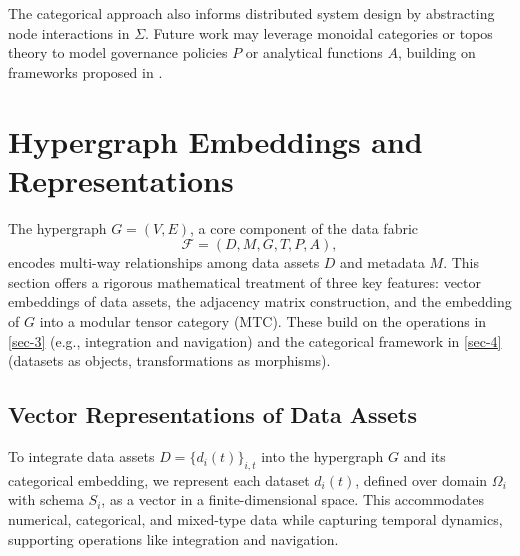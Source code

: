 \documentclass{amsart}
\newcommand\cF{\mathcal{F}}
\begin{document}
The categorical approach also informs distributed system design by abstracting node interactions in \( \Sigma \). Future work may leverage monoidal categories or topos theory to model governance policies \( P \) or analytical functions \( A \), building on frameworks proposed in \cite{Schultz2016}.

\section{Hypergraph Embeddings and Representations} \label{sec-5}

The hypergraph \( G = (V, E) \), a core component of the data fabric 
\[
 \cF = (D, M, G, T, P, A),
 \]
  encodes multi-way relationships among data assets \( D \) and metadata \( M \). This section offers a rigorous mathematical treatment of three key features: vector embeddings of data assets, the adjacency matrix construction, and the embedding of \( G \) into a modular tensor category (MTC). These build on the operations in \cref{sec-3} (e.g., integration and navigation) and the categorical framework in \cref{sec-4} (datasets as objects, transformations as morphisms). 




\subsection{Vector Representations of Data Assets} \label{subsec:vector_representations}
To integrate data assets \( D = \{d_i(t)\}_{i,t} \) into the hypergraph \( G \) and its categorical embedding, we represent each dataset \( d_i(t) \), defined over domain \( \Omega_i \) with schema \( S_i \), as a vector in a finite-dimensional space. This accommodates numerical, categorical, and mixed-type data while capturing temporal dynamics, supporting operations like integration and navigation.
\end{document}
